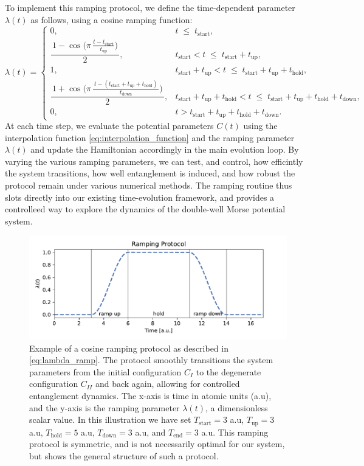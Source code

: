 \documentclass{subfiles}
\begin{document}
To implement this ramping protocol, we define the time-dependent parameter $\lambda(t)$ as follows, using a cosine ramping function:
\begin{equation*}
\lambda(t)=
\begin{cases}
0,
&
t \;\le\;
t_{\mathrm{start}},
\\[6pt]
\dfrac{\,1-\cos\!\bigl(\pi\,\tfrac{t - t_{\mathrm{start}}}{t_{\mathrm{up}}}\bigr)\,}{2},
&
t_{\mathrm{start}} < t \;\le\; t_{\mathrm{start}} + t_{\mathrm{up}},
\\[8pt]
1,
&
t_{\mathrm{start}} + t_{\mathrm{up}} < t \;\le\;
t_{\mathrm{start}} + t_{\mathrm{up}} + t_{\mathrm{hold}},
\\[6pt]
\dfrac{\,1+\cos\!\bigl(\pi\,\tfrac{\,t - (t_{\mathrm{start}}+t_{\mathrm{up}}+t_{\mathrm{hold}})\,}{t_{\mathrm{down}}}\bigr)\,}{2},
&
t_{\mathrm{start}} + t_{\mathrm{up}} + t_{\mathrm{hold}}
< t \;\le\;
t_{\mathrm{start}} + t_{\mathrm{up}} + t_{\mathrm{hold}} + t_{\mathrm{down}},
\\[6pt]
0,
&
t > t_{\mathrm{start}} + t_{\mathrm{up}} + t_{\mathrm{hold}} + t_{\mathrm{down}}.
\end{cases}
\label{eq:lambda_ramp}
\end{equation*}
At each time step, we evaluate the potential parameters $C(t)$ using the interpolation function \eqref{eq:interpolation_function} and the ramping parameter $\lambda(t)$ and update the Hamiltonian accordingly in the main evolution loop. By varying the various ramping parameters, we can test, and control, how efficintly the system transitions, how well entanglement is induced, and how robust the protocol remain under various numerical methods. The ramping routine thus slots directly into our existing time-evolution framework, and provides a controlleed way to explore the dynamics of the double-well Morse potential system.
\begin{figure}[h!]
    \centering
    \includegraphics[width=1.0\textwidth]{figs/ramp_protocol.pdf}
    \caption{Example of a cosine ramping protocol as described in \eqref{eq:lambda_ramp}. The protocol smoothly transitions the system parameters from the initial configuration $C_I$ to the degenerate configuration $C_{II}$ and back again, allowing for controlled entanglement dynamics. The x-axis is time in atomic units (a.u), and the y-axis is the ramping parameter $\lambda(t)$, a dimensionless scalar value. In this illustration we have set $T_{\mathrm{start}} = 3$ a.u, $T_{\mathrm{up}} = 3$ a.u, $T_{\mathrm{hold}} = 5$ a.u, $T_{\mathrm{down}} = 3$ a.u, and $T_{\mathrm{end}} = 3$ a.u. This ramping protocol is symmetric, and is not necessarily optimal for our system, but shows the general structure of such a protocol.}
\end{figure}
\end{document}
